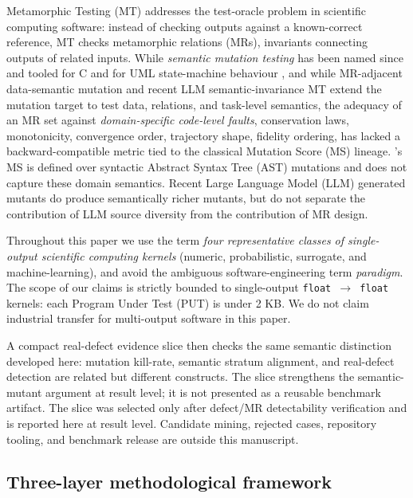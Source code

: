 \documentclass[manuscript,screen,review]{acmart}
\begin{document}
Metamorphic Testing (MT) addresses the test-oracle problem in scientific
computing software: instead of checking outputs against a known-correct
reference, MT checks metamorphic relations (MRs), invariants connecting
outputs of related inputs. While \emph{semantic mutation testing} has
been named since \citet{7a6c280d9584691800e71876c716ea229335abeb} and tooled for C \citep{dan2012smtc}
and for UML state-machine behaviour \citep{derezinska2019uml}, and while
MR-adjacent data-semantic mutation \citep{sun2016mumt,sun2024datamutation,zhu2020datamorphic,chan2024metamorphic}
and recent LLM semantic-invariance MT \citep{0fa97cc4e2a0ffb6a777669b1b541c0372fac0d2} extend the mutation target
to test data, relations, and task-level semantics, the adequacy of an MR
set against \emph{domain-specific code-level faults}, conservation laws,
monotonicity, convergence order, trajectory shape, fidelity ordering,
has lacked a backward-compatible metric tied to the classical Mutation
Score (MS) lineage. \citeauthor{d7c38286734419b52de4262c9802ebdfcf4b9447}'s \citeyearpar{d7c38286734419b52de4262c9802ebdfcf4b9447} MS is defined over syntactic
Abstract Syntax Tree (AST) mutations and does not capture these domain
semantics. Recent Large Language Model (LLM) generated mutants \citep{tip2025llmorpheus,humbatova2021deepcrime} do
produce semantically richer mutants, but do not separate the
contribution of LLM source diversity from the contribution of MR design.

Throughout this paper we use the term \emph{four representative classes
of single-output scientific computing kernels} (numeric, probabilistic,
surrogate, and machine-learning), and avoid the ambiguous
software-engineering term \emph{paradigm}. The scope of our claims is
strictly bounded to single-output \texttt{float\ $\to$\ float} kernels: each
Program Under Test (PUT) is under 2 KB. We do not claim industrial transfer
for multi-output software in this paper.

A compact real-defect evidence slice then checks the same semantic
distinction developed here: mutation kill-rate, semantic stratum
alignment, and real-defect detection are related but different
constructs. The slice strengthens the semantic-mutant argument at result
level; it is not presented as a reusable benchmark artifact. The slice was
selected only after defect/MR detectability verification and is reported
here at result level. Candidate mining, rejected cases, repository
tooling, and benchmark release are outside this manuscript.

\subsection{Three-layer methodological framework}\label{three-layer-methodological-framework}
\end{document}
